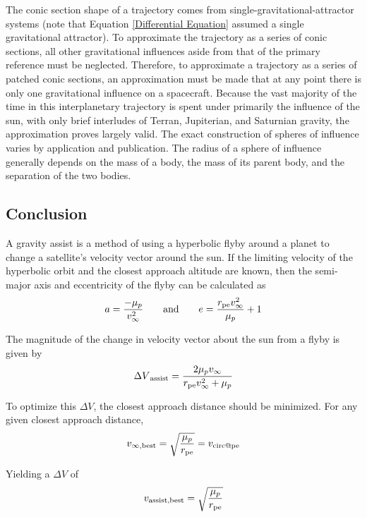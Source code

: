 \documentclass[../basicOrbitalDynamics.tex]{subfiles}
\begin{document}
The conic section shape of a trajectory comes from single-gravitational-attractor systems (note that Equation \eqref{Differential Equation} assumed a single gravitational attractor). To approximate the trajectory as a series of conic sections, all other gravitational influences aside from that of the primary reference must be neglected. Therefore, to approximate a trajectory as a series of patched conic sections, an approximation must be made that at any point there is only one gravitational influence on a spacecraft. Because the vast majority of the time in this interplanetary trajectory is spent under primarily the influence of the sun, with only brief interludes of Terran, Jupiterian, and Saturnian gravity, the approximation proves largely valid. The exact construction of spheres of influence varies by application and publication. The radius of a sphere of influence generally depends on the mass of a body, the mass of its parent body, and the separation of the two bodies.


\bigskip\bigskip
\subsection{Conclusion}

A gravity assist is a method of using a hyperbolic flyby around a planet to change a satellite's velocity vector around the sun. If the limiting velocity of the hyperbolic orbit and the closest approach altitude are known, then the semi-major axis and eccentricity of the flyby can be calculated as
$$a=\frac{-\mu_p}{v_\infty^2}\qquad\text{and}\qquad e=\frac{{r}_\text{pe}v_\infty^2}{\mu_p}+1$$

The magnitude of the change in velocity vector about the sun from a flyby is given by
$${\Delta V}_\text{assist}=\frac{2\mu_p v_\infty}{{r}_\text{pe}v_\infty^2+\mu_p}$$

To optimize this $\Delta V$, the closest approach distance should be minimized. For any given closest approach distance,
$$v_{\infty,\text{best}}=\sqrt{\frac{\mu_p}{{r}_\text{pe}}}={v}_\text{circ@pe}$$

Yielding a $\Delta V$ of
$${v}_\text{assist,best} = \sqrt{\frac{\mu_p}{{r}_\text{pe}}}$$
\end{document}
